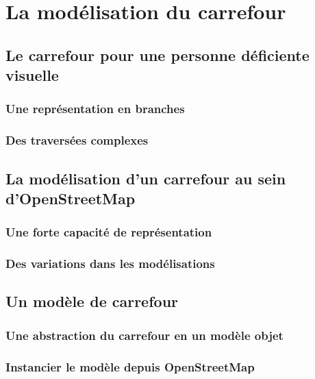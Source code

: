 \chapter{La modélisation du carrefour}

\todo{}

\section{Le carrefour pour une personne déficiente visuelle}

\todo{}

\subsection{Une représentation en branches}

\todo{}

\subsection{Des traversées complexes}

\todo{}

\section{La modélisation d’un carrefour au sein d’OpenStreetMap}

\todo{}

\subsection{Une forte capacité de représentation}

\todo{}

\subsection{Des variations dans les modélisations}

\todo{}

\section{Un modèle de carrefour}

\todo{}

\subsection{Une abstraction du carrefour en un modèle objet}

\todo{}

\subsection{Instancier le modèle depuis OpenStreetMap}

\todo{}